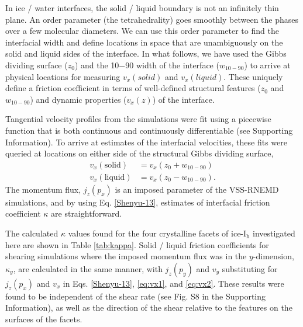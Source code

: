 In ice / water interfaces, the solid / liquid boundary is not
an infinitely thin plane. An order parameter (the tetrahedrality) goes
smoothly between the phases over a few molecular diameters.  We can
use this order parameter to find the interfacial width and define
locations in space that are unambiguously on the solid and liquid
sides of the interface.  In what follows, we have used the Gibbs
dividing surface ($z_0$) and the 10$-$90 width of the interface
($w_\mathrm{10-90}$) to arrive at physical locations for measuring
$v_{x}(solid)$ and $v_{x}(liquid)$.  These uniquely define a friction
coefficient in terms of well-defined structural features ($z_0$ and
$w_\mathrm{10-90}$) and dynamic properties ($v_{x}(z)$) of the
interface.

Tangential velocity profiles from the simulations were fit using a
piecewise function that is both continuous and continuously
differentiable (see Supporting Information). To arrive at estimates of
the interfacial velocities, these fits were queried at locations on
either side of the structural Gibbs dividing surface,
\begin{align}
v_{x}(\mathrm{solid}) & = v_{x}( z_0 + w_\mathrm{10-90})  \label{eq:vx1}\\
v_{x}(\mathrm{liquid}) & = v_{x}( z_0 - w_\mathrm{10-90}). \label{eq:vx2}
\end{align}
The momentum flux, $j_{z}(p_{x})$ is an imposed parameter of the
VSS-RNEMD simulations, and by using Eq. \eqref{Shenyu-13}, estimates
of interfacial friction coefficient $\kappa$ are straightforward.

The calculated $\kappa$ values found for the four crystalline facets
of ice-I$_\mathrm{h}$ investigated here are shown in Table
\ref{tab:kappa}. Solid / liquid friction coefficients for shearing
simulations where the imposed momentum flux was in the $y$-dimension,
$\kappa_{y}$, are calculated in the same manner, with $j_{z}(p_{y})$
and $v_{y}$ substituting for $j_{z}(p_{x})$ and $v_{x}$ in
Eqs. \eqref{Shenyu-13}, \eqref{eq:vx1}, and \eqref{eq:vx2}.  These
results were found to be independent of the shear rate (see Fig. S8
in the Supporting Information), as well as the direction of the shear
relative to the features on the surfaces of the facets.

